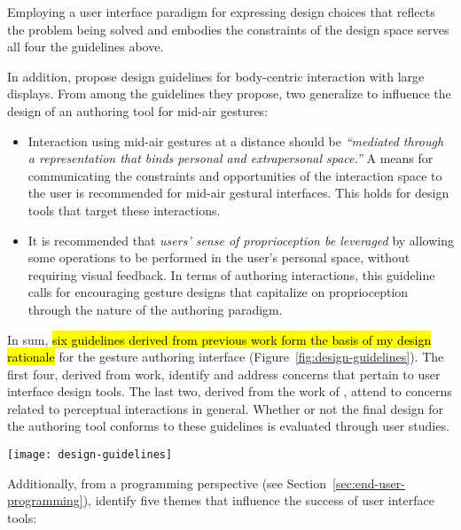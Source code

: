 Employing a user interface paradigm for expressing design choices that reflects the problem being solved and embodies the constraints of the design space \parencite{Norman:1993} serves all four the guidelines above.

In addition, \textcite{Shoemaker:2010} propose design guidelines for body-centric interaction with large displays. From among the guidelines they propose, two generalize to influence the design of an authoring tool for mid-air gestures:

\begin{itemize}
\item Interaction using mid-air gestures at a distance should be \emph{“mediated through a representation that binds personal and extrapersonal space.”} A means for communicating the constraints and opportunities of the interaction space to the user is recommended for mid-air gestural interfaces. This holds for design tools that target these interactions.
\item It is recommended that \emph{users’ sense of proprioception be leveraged} by allowing some operations to be performed in the user’s personal space, without requiring visual feedback. In terms of authoring interactions, this guideline calls for encouraging gesture designs that capitalize on proprioception through the nature of the authoring paradigm.
\end{itemize}

In sum, \hl{six guidelines derived from previous work form the basis of my design rationale} for the gesture authoring interface (Figure~\ref{fig:design-guidelines}). The first four, derived from  work, identify and address concerns that pertain to user interface design tools. The last two, derived from the work of \textcite{Shoemaker:2010}, attend to concerns related to perceptual interactions in general. Whether or not the final design for the authoring tool conforms to these guidelines is evaluated through user studies.

\begin{SCfigure}[\sidecaptionrelwidth][b]
\centering
\texttt{[image: design-guidelines]}
\caption{Guidelines derived from the literature formed the basis of the design rationale for a gesture authoring tool.}
\label{fig:design-guidelines}
\end{SCfigure}

\clearpage

Additionally, from a programming perspective (see Section~\ref{sec:end-user-programming}), \textcite{Myers:2000} identify five themes that influence the success of user interface tools:

